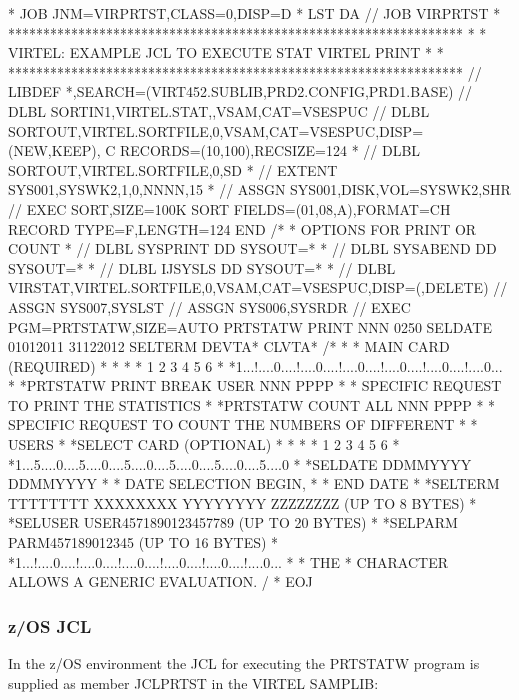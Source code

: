 \documentclass[letterpaper,10pt,english]{sphinxmanual}
\begin{document}
\begin{sphinxVerbatim}[commandchars=\\\{\}]
* \PYGZdl{}\PYGZdl{} JOB JNM=VIRPRTST,CLASS=0,DISP=D
* \PYGZdl{}\PYGZdl{} LST DA
// JOB VIRPRTST
* *****************************************************************
* * VIRTEL: EXAMPLE JCL TO EXECUTE STAT VIRTEL PRINT *
* *****************************************************************
// LIBDEF *,SEARCH=(VIRT452.SUBLIB,PRD2.CONFIG,PRD1.BASE)
// DLBL SORTIN1,\PYGZsq{}VIRTEL.STAT\PYGZsq{},,VSAM,CAT=VSESPUC
// DLBL SORTOUT,\PYGZsq{}\PYGZpc{}VIRTEL.SORTFILE\PYGZsq{},0,VSAM,CAT=VSESPUC,DISP=(NEW,KEEP), C
RECORDS=(10,100),RECSIZE=124
* // DLBL SORTOUT,\PYGZsq{}VIRTEL.SORTFILE\PYGZsq{},0,SD
* // EXTENT SYS001,SYSWK2,1,0,NNNN,15
* // ASSGN SYS001,DISK,VOL=SYSWK2,SHR
// EXEC SORT,SIZE=100K
SORT FIELDS=(01,08,A),FORMAT=CH
RECORD TYPE=F,LENGTH=124
END
/*
* OPTIONS FOR PRINT OR COUNT
* // DLBL SYSPRINT DD SYSOUT=*
* // DLBL SYSABEND DD SYSOUT=*
* // DLBL IJSYSLS DD SYSOUT=*
*
// DLBL VIRSTAT,\PYGZsq{}\PYGZpc{}VIRTEL.SORTFILE\PYGZsq{},0,VSAM,CAT=VSESPUC,DISP=(,DELETE)
// ASSGN SYS007,SYSLST
// ASSGN SYS006,SYSRDR
// EXEC PGM=PRTSTATW,SIZE=AUTO
PRTSTATW PRINT NNN 0250
SELDATE 01012011 31122012
SELTERM DEVTA* CLVTA*
/*
* * MAIN CARD (REQUIRED)
* * \PYGZhy{}\PYGZhy{}\PYGZhy{}\PYGZhy{}\PYGZhy{}\PYGZhy{}\PYGZhy{}\PYGZhy{}\PYGZhy{}
* * 1 2 3 4 5 6
* *1...!....0....!....0....!....0....!....0....!....0....!....0...
* *PRTSTATW PRINT BREAK USER NNN PPPP
* * SPECIFIC REQUEST TO PRINT THE STATISTICS
* *PRTSTATW COUNT \PYGZdl{}ALL\PYGZdl{} NNN PPPP
* * SPECIFIC REQUEST TO COUNT THE NUMBERS OF DIFFERENT
* * USERS
* *SELECT CARD (OPTIONAL)
* * \PYGZhy{}\PYGZhy{}\PYGZhy{}\PYGZhy{}\PYGZhy{}\PYGZhy{}\PYGZhy{}\PYGZhy{}\PYGZhy{}\PYGZhy{}\PYGZhy{}
* * 1 2 3 4 5 6
* *1...5....0....5....0....5....0....5....0....5....0....5....0
* *SELDATE DDMMYYYY DDMMYYYY
* * DATE SELECTION BEGIN,
* * END DATE
* *SELTERM TTTTTTTT XXXXXXXX YYYYYYYY ZZZZZZZZ (UP TO 8 BYTES)
* *SELUSER USER4571890123457789 (UP TO 20 BYTES)
* *SELPARM PARM457189012345 (UP TO 16 BYTES)
* *1...!....0....!....0....!....0....!....0....!....0....!....0...
* * THE \PYGZsq{}*\PYGZsq{} CHARACTER ALLOWS A GENERIC EVALUATION.
/\PYGZam{}
* \PYGZdl{}\PYGZdl{} EOJ
\end{sphinxVerbatim}



\subsubsection{z/OS JCL}
\label{\detokenize{audit_operations_ and_performance:z-os-jcl}}
In the z/OS environment the JCL for executing the PRTSTATW program is supplied as member JCLPRTST in the VIRTEL SAMPLIB:
\end{document}
